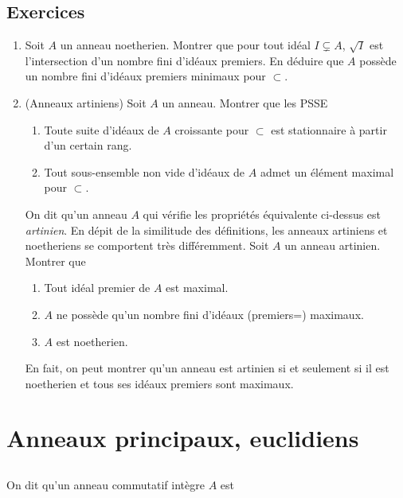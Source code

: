 \documentclass[a4paper, oneside, 12pt]{book}
\theoremstyle{definition} %
\begin{document}
\section{Exercices}\label{NoethExercices}
    \begin{enumerate}[leftmargin=* ,parsep=0cm,itemsep=0cm,topsep=0cm]
     \item  Soit $A$ un anneau noetherien. Montrer que pour tout idéal  $I\subsetneq A$, $\sqrt{I}$ est l'intersection d'un nombre fini d'idéaux premiers. En déduire que $A$ possède un nombre fini d'idéaux premiers minimaux pour $\subset$. \\
     \item   (Anneaux artiniens) Soit $A$ un anneau. Montrer que les PSSE\\
       \begin{enumerate} 
     \item  Toute suite  d'idéaux de $A$ croissante pour $\subset$ est stationnaire à partir d'un certain rang.
     \item Tout sous-ensemble non vide d'idéaux de $A$ admet un élément maximal pour $\subset $.\\
\end{enumerate}
 On dit qu'un anneau $A$ qui vérifie les propriétés équivalente ci-dessus est \textit{artinien}. En dépit de la similitude des définitions, les anneaux artiniens et noetheriens se comportent très différemment. Soit $A$ un anneau artinien. Montrer que\\
 \begin{enumerate} 
     \item  Tout idéal premier de $A $ est maximal.
     \item  $A$ ne possède qu'un nombre fini d'idéaux (premiers=) maximaux.
      \item  $A$ est noetherien.\\
\end{enumerate}
En fait, on peut montrer qu'un anneau est artinien si et seulement si il est noetherien et tous ses idéaux premiers sont maximaux. 
\end{enumerate}



  \chapter{Anneaux principaux, euclidiens } 

\section{ }On dit qu'un anneau commutatif intègre $A$ est \\
\end{document}

